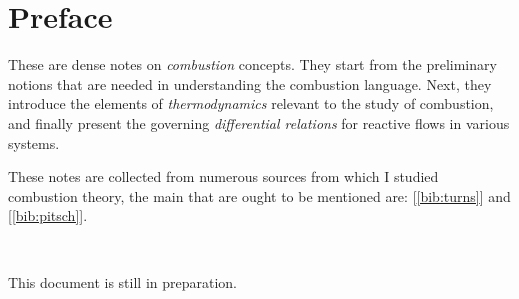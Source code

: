 \documentclass[10pt,twocolumn]{article}
\begin{document}

\vspace{10mm}

\setlength{\parindent}{0cm}


\section*{Preface}

These are dense notes on \textit{combustion} concepts. They start from the preliminary notions that are needed in understanding the combustion language. Next, they introduce the elements of \textit{thermodynamics} relevant to the study of combustion, and finally present the governing \textit{differential relations} for reactive flows in various systems.

These notes are collected from numerous sources from which I studied combustion theory, the main that are ought to be mentioned are: [\ref{bib:turns}] and [\ref{bib:pitsch}].

\,\,

This document is still in preparation.

\tableofcontents
\end{document}
